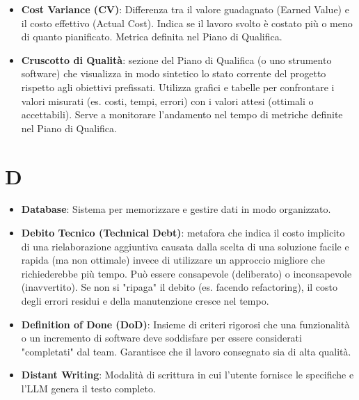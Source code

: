 \documentclass[11pt,a4paper]{article}
\begin{document}
\begin{itemize}
\item \textbf{Cost Variance (CV)}: Differenza tra il valore guadagnato (Earned Value) e il costo effettivo (Actual Cost). Indica se il lavoro svolto è costato più o meno di quanto pianificato. Metrica definita nel Piano di Qualifica.

\item \textbf{Cruscotto di Qualità}: sezione del Piano di Qualifica (o uno strumento software) che visualizza in modo sintetico lo stato corrente del progetto rispetto agli obiettivi prefissati. Utilizza grafici e tabelle per confrontare i valori misurati (es. costi, tempi, errori) con i valori attesi (ottimali o accettabili). Serve a monitorare l'andamento nel tempo di metriche definite nel Piano di Qualifica.

\end{itemize}
\newpage

\section*{D}
\begin{itemize}
\item \textbf{Database}: Sistema per memorizzare e gestire dati in modo organizzato.

\item \textbf{Debito Tecnico (Technical Debt)}: metafora che indica il costo implicito di una rielaborazione aggiuntiva causata dalla scelta di una soluzione facile e rapida (ma non ottimale) invece di utilizzare un approccio migliore che richiederebbe più tempo. Può essere consapevole (deliberato) o inconsapevole (inavvertito).
Se non si "ripaga" il debito (es. facendo refactoring), il costo degli errori residui e della manutenzione cresce nel tempo.

\item \textbf{Definition of Done (DoD)}: Insieme di criteri rigorosi che una funzionalità o un incremento di software deve soddisfare per essere considerati "completati" dal team. Garantisce che il lavoro consegnato sia di alta qualità.

\item \textbf{Distant Writing}: Modalità di scrittura in cui l'utente fornisce le specifiche e l'LLM genera il testo completo.
\end{itemize}
\newpage
\end{document}
